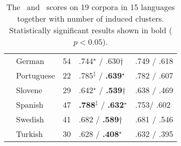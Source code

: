 \begin{table}[t]
\begin{tabular}{l|l|l|l|l|}
    & German      & 54   & .744$^\star$ / .630$\dagger$& .749 / .618\\
    & Portuguese  & 22   & .785$^\ddagger$ / {\bf .639}$^\star$ & .782 / .607\\
    & Slovene     & 29   & .642$^\star$ / {\bf.539}$\dagger$    & .638 / .469\\
    & Spanish     & 47   & {\bf.788}$^\ddagger$ / {\bf .632}$^\star$          & .753/ .602\\
    & Swedish     & 41   & .682 / {\bf.589}$\dagger$        & .681 / .546\\
    & Turkish     & 30   & .628 / {\bf .408}$^\star$        & .632 / .395\\ \hline
  \end{tabular}
  \caption{The \mto\ and \vm\ scores on 19 corpora in 15 languages together
  with number of induced clusters.  Statistically significant results shown
  in bold ($p < 0.05$).
}  
  \label{tab:multiresults}
\end{table}
